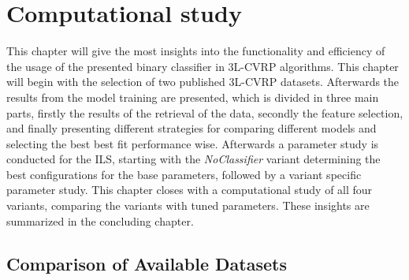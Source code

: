 \chapter{Computational study}
\label{chap:computational_study}
This chapter will give the most insights into the functionality and efficiency of the usage of the presented binary classifier in
\gls{3L-CVRP} algorithms. This chapter will begin with the selection of two published \gls{3L-CVRP} datasets.
Afterwards the results from the model training are presented, which
is divided in three main parts, firstly the results of the retrieval of the data, secondly the feature selection, and finally presenting
different strategies for comparing different models and selecting the best best fit performance wise.
Afterwards a parameter study is conducted for the \gls{ILS}, starting with the \textit{NoClassifier} variant determining
the best configurations for the base parameters, followed by a variant specific parameter study.
This chapter closes with a computational study of all four variants, comparing the variants with tuned parameters.
These insights are summarized in the concluding chapter.

\section{Comparison of Available Datasets}
\label{sec:dataset_selection}

